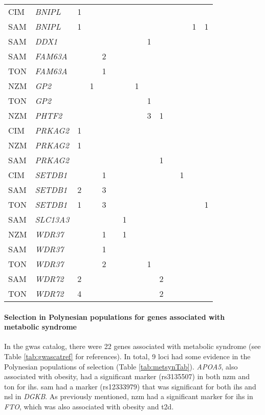 \documentclass[]{report}
\let\oldparagraph\paragraph
\renewcommand{\paragraph}[1]{\oldparagraph{#1}\mbox{}}
\begin{document}
\begin{ThreePartTable}
\begin{longtable}[t]{llllllllllllll}
CIM & \em{BNIPL} & 1 &  &  &  &  &  &  &  &  &  &  & \\
SAM & \em{BNIPL} & 1 &  &  &  &  &  &  &  &  &  & 1 & 1\\
SAM & \em{DDX1} &  &  &  &  &  &  & 1 &  &  &  &  & \\
\addlinespace
SAM & \em{FAM63A} &  &  & 2 &  &  &  &  &  &  &  &  & \\
TON & \em{FAM63A} &  &  & 1 &  &  &  &  &  &  &  &  & \\
NZM & \em{GP2} &  & 1 &  &  &  & 1 &  &  &  &  &  & \\
TON & \em{GP2} &  &  &  &  &  &  & 1 &  &  &  &  & \\
NZM & \em{PHTF2} &  &  &  &  &  &  & 3 & 1 &  &  &  & \\
\addlinespace
CIM & \em{PRKAG2} & 1 &  &  &  &  &  &  &  &  &  &  & \\
NZM & \em{PRKAG2} & 1 &  &  &  &  &  &  &  &  &  &  & \\
SAM & \em{PRKAG2} &  &  &  &  &  &  &  & 1 &  &  &  & \\
CIM & \em{SETDB1} &  &  & 1 &  &  &  &  &  &  & 1 &  & \\
SAM & \em{SETDB1} & 2 &  & 3 &  &  &  &  &  &  &  &  & \\
\addlinespace
TON & \em{SETDB1} & 1 &  & 3 &  &  &  &  &  &  &  &  & 1\\
SAM & \em{SLC13A3} &  &  &  &  & 1 &  &  &  &  &  &  & \\
NZM & \em{WDR37} &  &  & 1 &  & 1 &  &  &  &  &  &  & \\
SAM & \em{WDR37} &  &  & 1 &  &  &  &  &  &  &  &  & \\
TON & \em{WDR37} &  &  & 2 &  &  &  & 1 &  &  &  &  & \\
\addlinespace
SAM & \em{WDR72} & 2 &  &  &  &  &  &  & 2 &  &  &  & \\
TON & \em{WDR72} & 4 &  &  &  &  &  &  & 2 &  &  &  & \\*
\end{longtable}
\end{ThreePartTable}

\endgroup{}

\paragraph{Selection in Polynesian populations for genes associated with
metabolic
syndrome}\label{selection-in-polynesian-populations-for-genes-associated-with-metabolic-syndrome}

In the \gls{gwas} catalog, there were 22 genes associated with metabolic
syndrome (see Table \ref{tab:gwascatref} for references). In total, 9
loci had some evidence in the Polynesian populations of selection (Table
\ref{tab:metsynTab}). \emph{APOA5}, also associated with obesity, had a
significant marker (rs3135507) in both \gls{nzm} and \gls{ton} for
\gls{ihs}. \Gls{sam} had a marker (rs12333979) that was significant for
both \gls{ihs} and \gls{nsl} in \emph{DGKB}. As previously mentioned,
\gls{nzm} had a significant marker for \gls{ihs} in \emph{FTO}, which
was also associated with obesity and \gls{t2d}.
\end{document}
